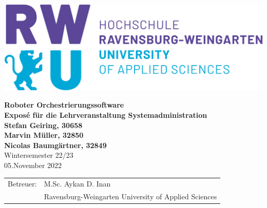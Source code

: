 \pagestyle{empty}



\begin{center}


\vspace*{2cm}
\includegraphics[scale=0.15]{imgs/rwu_logo.png}
\vspace*{3cm}

\huge
\textbf{Roboter Orchestrierungssoftware}\\
\Large
\vspace*{2cm}
\noindent \textbf{Expos\'e für die Lehrveranstaltung Systemadministration}\\
\vspace*{0.5cm}
\noindent \textbf{Stefan Geiring, 30658}\\
\noindent \textbf{Marvin Müller, 32850}\\
\noindent \textbf{Nicolas Baumgärtner, 32849}\\
\vspace*{0.5cm}
Wintersemester 22/23\\
\normalsize 
05.November 2022
\vspace*{2cm}
\end{center}


\vspace*{4.5cm}
\begin{tabular}{ll}
Betreuer: & M.Sc. Aykan D. Inan \\
 & Ravensburg-Weingarten University of Applied Sciences\\
\end{tabular}

